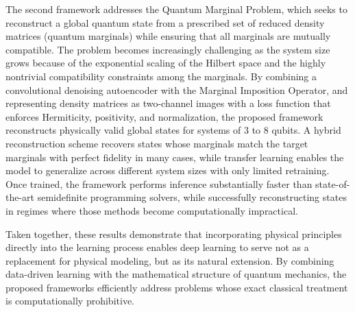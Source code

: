 The second framework addresses the Quantum Marginal Problem, which seeks to reconstruct a global quantum state from a prescribed set of reduced density matrices (quantum marginals) while ensuring that all marginals are mutually compatible. The problem becomes increasingly challenging as the system size grows because of the exponential scaling of the Hilbert space and the highly nontrivial compatibility constraints among the marginals. By combining a convolutional denoising autoencoder with the Marginal Imposition Operator, and representing density matrices as two-channel images with a loss function that enforces Hermiticity, positivity, and normalization, the proposed framework reconstructs physically valid global states for systems of 3 to 8 qubits. A hybrid reconstruction scheme recovers states whose marginals match the target marginals with perfect fidelity in many cases, while transfer learning enables the model to generalize across different system sizes with only limited retraining. Once trained, the framework performs inference substantially faster than state-of-the-art semidefinite programming solvers, while successfully reconstructing states in regimes where those methods become computationally impractical.

Taken together, these results demonstrate that incorporating physical principles directly into the learning process enables deep learning to serve not as a replacement for physical modeling, but as its natural extension. By combining data-driven learning with the mathematical structure of quantum mechanics, the proposed frameworks efficiently address problems whose exact classical treatment is computationally prohibitive.